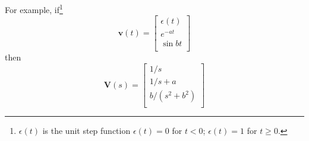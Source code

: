 For example, if\ifnotes\footnote{$\epsilon(t)$ is the unit step function
  $\epsilon(t)=0$ for $t < 0$; $\epsilon(t)=1$ for $t \ge 0$.}\fi
\begin{displaymath}
  \mathbf{v}(t)=\left[ \begin{array}{c}
   \epsilon(t) \\
   e^{-at} \\
   \sin bt \\
  \end{array} \right]
\end{displaymath}
then
\begin{displaymath}
  \mathbf{V}(s)=\left[ \begin{array}{c}
   1/s \\
   1/s+a \\
   b/(s^2+b^2) \\
  \end{array} \right]
\end{displaymath}

\endinput

